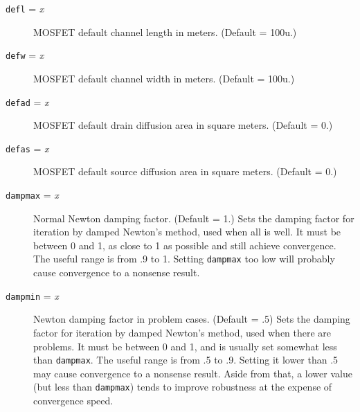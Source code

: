 \begin{description}
\item[{\tt defl} = {\it x}] MOSFET default channel length in 
meters.  (Default = 100u.)

\item[{\tt defw} = {\it x}]  MOSFET default channel width in 
meters.  (Default = 100u.)

\item[{\tt defad} = {\it x}] MOSFET default drain diffusion area
in square meters.  (Default = 0.)

\item[{\tt defas} = {\it x}]  MOSFET default source diffusion area
in square meters.  (Default = 0.)


        
\item[{\tt dampmax} = {\it x}] Normal Newton damping factor.
(Default = 1.)  Sets the damping factor for iteration by damped
Newton's method, used when all is well.  It must be between 0 and 1,
as close to 1 as possible and still achieve convergence.  The useful
range is from .9 to 1.  Setting {\tt dampmax} too low will probably cause
convergence to a nonsense result.

\item[{\tt dampmin} = {\it x}] Newton damping factor in problem
cases.  (Default = .5)  Sets the damping factor for iteration by
damped Newton's method, used when there are problems.  It must be
between 0 and 1, and is usually set somewhat less than {\tt dampmax}.
The useful range is from .5 to .9.  Setting it lower than .5 may
cause convergence to a nonsense result.  Aside from that, a lower
value (but less than {\tt dampmax}) tends to improve robustness at
the expense of convergence speed.


\end{description}
